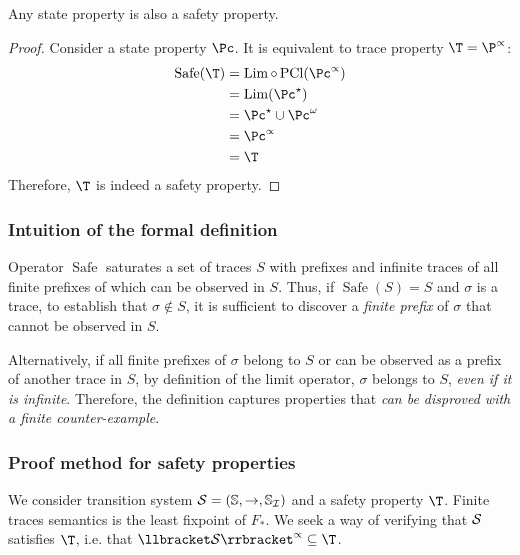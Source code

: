 \documentclass[toc]{../cs-classes/cs-classes}
\DeclareMathOperator{\pcl}{PCl}
\DeclareMathOperator{\Lim}{Lim}
\DeclareMathOperator{\safe}{Safe}
\begin{document}
\begin{theorem}
    Any state property is also a safety property.
\end{theorem}
\begin{proof}
    Consider a state property $\Pc$. It is equivalent to trace property $\T = \P^\propto$:
    \begin{equation*}
        \begin{aligned}
            \safe(\T) &= \Lim \circ \pcl (\Pc^\propto) \\
            &= \Lim(\Pc^\star) \\
            &= \Pc^\star \cup \Pc^\omega \\
            &= \Pc^\propto \\
            &= \T
        \end{aligned}
    \end{equation*}
    Therefore, $\T$ is indeed a safety property.
\end{proof}

\subsubsection{Intuition of the formal definition}
Operator $\safe$ saturates a set of traces $S$ with prefixes and infinite traces of all finite prefixes of which can be observed in $S$. Thus, if $\safe(S)=S$ and $\sigma$ is a trace, to establish that $\sigma\notin S$, it is sufficient to discover a \emph{finite prefix} of $\sigma$ that cannot be observed in $S$. 

Alternatively, if all finite prefixes of $\sigma$ belong to $S$ or can be observed as a prefix of another trace in $S$, by definition of the limit operator, $\sigma$ belongs to $S$, \emph{even if it is infinite}. Therefore, the definition captures properties that \emph{can be disproved with a finite counter-example}.

\subsubsection{Proof method for safety properties}
We consider transition system $\mathcal{S}=(\mathbb{S},\to,\mathbb{S}_{\mathcal{I}})$ and a safety property $\T$. Finite traces semantics is the least fixpoint of $F_*$. We seek a way of verifying that $\mathcal{S}$ satisfies $\T$, i.e. that $\llbracket \Sc\rrbracket^\propto\subseteq\T$.
\end{document}
